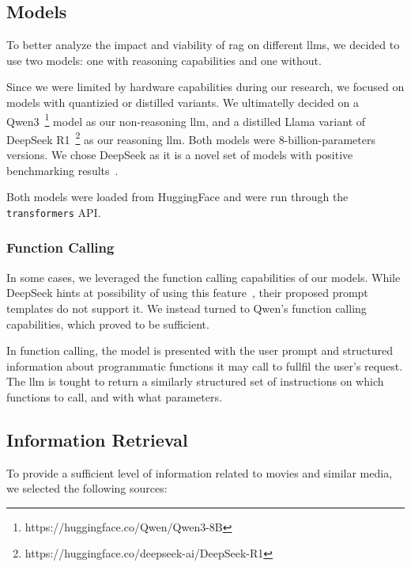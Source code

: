 \documentclass[fleqn,moreauthors,10pt]{ds_report}
\begin{document}
\subsection*{Models}

To better analyze the impact and viability of \ac{rag} on different \acp{llm}, we decided to use two models: one with reasoning capabilities and one without.

Since we were limited by hardware capabilities during our research, we focused on models with quantizied or distilled variants. We ultimatelly decided on a Qwen3~\footnote{https://huggingface.co/Qwen/Qwen3-8B} model as our non-reasoning \ac{llm}, and a distilled Llama variant of DeepSeek R1~\footnote{https://huggingface.co/deepseek-ai/DeepSeek-R1} as our reasoning \ac{llm}. Both models were 8-billion-parameters versions. We chose DeepSeek as it is a novel set of models with positive benchmarking results~\cite{deepseek3}.

Both models were loaded from HuggingFace and were run through the \texttt{transformers} API.

\subsubsection*{Function Calling}

In some cases, we leveraged the function calling capabilities of our models. While DeepSeek hints at possibility of using this feature~\cite{deepseekFunctionCalling}, their proposed prompt templates do not support it. We instead turned to Qwen's function calling capabilities, which proved to be sufficient.

In function calling, the model is presented with the user prompt and structured information about programmatic functions it may call to fullfil the user's request. The \ac{llm} is tought to return a similarly structured set of instructions on which functions to call, and with what parameters.

\subsection*{Information Retrieval}

To provide a sufficient level of information related to movies and similar media, we selected the following sources:
\end{document}
